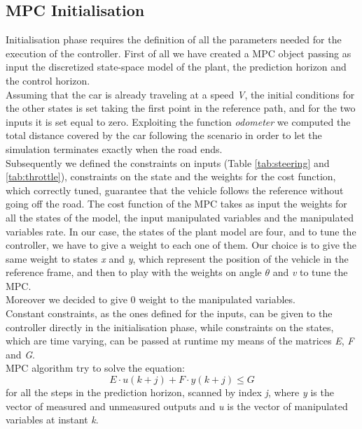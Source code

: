 \subsection{MPC Initialisation}
Initialisation phase requires the definition of all the parameters needed for the execution of the controller.
First of all we have created a MPC object passing as input the discretized state-space model of the plant, the prediction horizon and the control horizon.
\\Assuming that the car is already traveling at a speed \textit{V}, the initial conditions for the other states is set taking the first point in the reference path, and for the two inputs it is set equal to zero. Exploiting the function \textit{odometer} we computed the total distance covered by the car following the scenario in order to let the simulation terminates exactly when the road ends.
\\Subsequently we defined the constraints on inputs (Table \ref{tab:steering} and \ref{tab:throttle}), constraints on the state and the weights for the cost function, which correctly tuned, guarantee that the vehicle follows the reference without going off the road.
The cost function of the MPC takes as input the weights for all the states of the model, the input manipulated variables and the manipulated variables rate. In our case, the states of the plant model are four, and to tune the controller, we have to give a weight to each one of them. Our choice is to give the same weight to states \textit{x} and \textit{y}, which represent the position of the vehicle in the reference frame, and then to play with the weights on angle $\theta$ and \textit{v} to tune the MPC.\\
Moreover we decided to give 0 weight to the manipulated variables.\\
Constant constraints, as the ones defined for the inputs, can be given to the controller directly in the initialisation phase, while constraints on the states, which are time varying, can be passed at runtime my means of the matrices \textit{E}, \textit{F} and \textit{G}. \\
MPC algorithm try to solve the equation:
\begin{equation}
    E \cdot u(k+j) + F \cdot y(k+j)\leq G
    \label{ConstraintEquation}
\end{equation}
for all the steps in the prediction horizon, scanned by index \textit{j}, where \textit{y} is the vector of measured and unmeasured outputs and \textit{u} is the vector of manipulated variables at instant \textit{k}.





